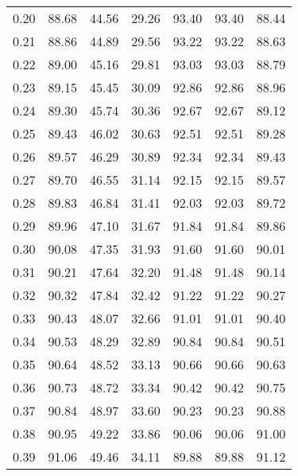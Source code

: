 \begin{tabular}{|c|c|c|c|c|c|c|}
      0.20 &     88.68 &     44.56 &      29.26 &   93.40 &      93.40 &         88.44 \\
      0.21 &     88.86 &     44.89 &      29.56 &   93.22 &      93.22 &         88.63 \\
      0.22 &     89.00 &     45.16 &      29.81 &   93.03 &      93.03 &         88.79 \\
      0.23 &     89.15 &     45.45 &      30.09 &   92.86 &      92.86 &         88.96 \\
      0.24 &     89.30 &     45.74 &      30.36 &   92.67 &      92.67 &         89.12 \\
      0.25 &     89.43 &     46.02 &      30.63 &   92.51 &      92.51 &         89.28 \\
      0.26 &     89.57 &     46.29 &      30.89 &   92.34 &      92.34 &         89.43 \\
      0.27 &     89.70 &     46.55 &      31.14 &   92.15 &      92.15 &         89.57 \\
      0.28 &     89.83 &     46.84 &      31.41 &   92.03 &      92.03 &         89.72 \\
      0.29 &     89.96 &     47.10 &      31.67 &   91.84 &      91.84 &         89.86 \\
      0.30 &     90.08 &     47.35 &      31.93 &   91.60 &      91.60 &         90.01 \\
      0.31 &     90.21 &     47.64 &      32.20 &   91.48 &      91.48 &         90.14 \\
      0.32 &     90.32 &     47.84 &      32.42 &   91.22 &      91.22 &         90.27 \\
      0.33 &     90.43 &     48.07 &      32.66 &   91.01 &      91.01 &         90.40 \\
      0.34 &     90.53 &     48.29 &      32.89 &   90.84 &      90.84 &         90.51 \\
      0.35 &     90.64 &     48.52 &      33.13 &   90.66 &      90.66 &         90.63 \\
      0.36 &     90.73 &     48.72 &      33.34 &   90.42 &      90.42 &         90.75 \\
      0.37 &     90.84 &     48.97 &      33.60 &   90.23 &      90.23 &         90.88 \\
      0.38 &     90.95 &     49.22 &      33.86 &   90.06 &      90.06 &         91.00 \\
      0.39 &     91.06 &     49.46 &      34.11 &   89.88 &      89.88 &         91.12 \\

\end{tabular}
